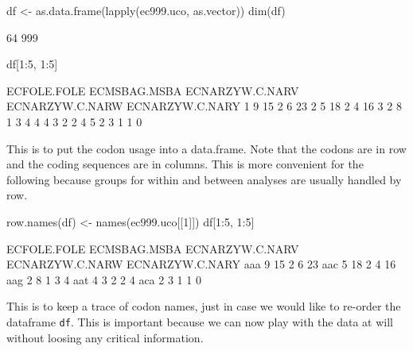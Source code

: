 \documentclass{article}
\begin{document}
\begin{Schunk}
\begin{Sinput}
 df <- as.data.frame(lapply(ec999.uco, as.vector))
 dim(df)
\end{Sinput}
\begin{Soutput}
[1]  64 999
\end{Soutput}
\begin{Sinput}
 df[1:5, 1:5]
\end{Sinput}
\begin{Soutput}
  ECFOLE.FOLE ECMSBAG.MSBA ECNARZYW.C.NARV ECNARZYW.C.NARW ECNARZYW.C.NARY
1           9           15               2               6              23
2           5           18               2               4              16
3           2            8               1               3               4
4           4            3               2               2               4
5           2            3               1               1               0
\end{Soutput}
\end{Schunk}

This is to put the codon usage into a data.frame. Note that the codons are in row
and the coding sequences are in columns. This is more convenient for the following
because groups for within and between analyses are usually handled by row.

\begin{Schunk}
\begin{Sinput}
 row.names(df) <- names(ec999.uco[[1]])
 df[1:5, 1:5]
\end{Sinput}
\begin{Soutput}
    ECFOLE.FOLE ECMSBAG.MSBA ECNARZYW.C.NARV ECNARZYW.C.NARW ECNARZYW.C.NARY
aaa           9           15               2               6              23
aac           5           18               2               4              16
aag           2            8               1               3               4
aat           4            3               2               2               4
aca           2            3               1               1               0
\end{Soutput}
\end{Schunk}

This is to keep a trace of codon names, just in case we would like to re-order
the dataframe \texttt{df}. This is important because we can now play with
the data at will without loosing any critical information. 
\end{document}
